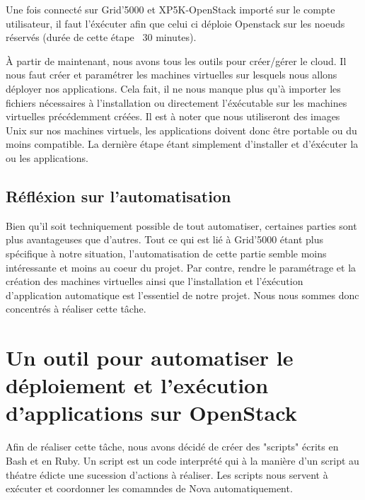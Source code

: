 \documentclass{report}
\begin{document}
Une fois connecté sur Grid'5000 et XP5K-OpenStack importé sur le compte utilisateur, il faut l'éxécuter afin que celui ci déploie Openstack sur les noeuds réservés (durée de cette étape ~30 minutes).\bigbreak

À partir de maintenant, nous avons tous les outils pour créer/gérer le cloud. Il nous faut créer et paramétrer les machines virtuelles sur lesquels nous allons déployer nos applications. Cela fait, il ne nous manque plus qu'à importer les fichiers nécessaires à l'installation ou directement l'éxécutable sur les machines virtuelles précédemment créées. Il est à noter que nous utiliseront des images Unix sur nos machines virtuels, les applications doivent donc être portable ou du moins compatible. 
La dernière étape étant simplement d'installer et d'éxécuter la ou les applications.







    \section{Réfléxion sur l'automatisation} 		
    Bien qu'il soit techniquement possible de tout automatiser, certaines parties sont plus avantageuses que d'autres. Tout ce qui est lié à Grid'5000 étant plus spécifique à notre situation, l'automatisation de cette partie semble moins intéressante et moins au coeur du projet.
    Par contre, rendre le paramétrage et la création des machines virtuelles ainsi que l'installation et l'éxécution d'application automatique est l'essentiel de notre projet. Nous nous sommes donc concentrés à réaliser cette tâche.
    



\chapter{Un outil pour automatiser le déploiement et l'exécution d'applications sur OpenStack}
   
Afin de réaliser cette tâche, nous avons décidé de créer des "scripts" écrits en Bash et en Ruby. Un script est un code interprété qui à la manière d'un script au théatre édicte une sucession d'actions à réaliser. Les scripts nous servent à exécuter et coordonner les comamndes de Nova automatiquement. 
   
\end{document}
